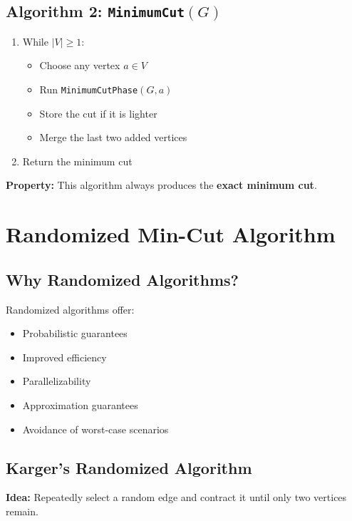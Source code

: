 \documentclass[11pt]{article}
\begin{document}
\subsection*{Algorithm 2: \texttt{MinimumCut$(G)$}}

\begin{enumerate}
    \item While $|V| \ge 1$:
    \begin{itemize}
        \item Choose any vertex $a \in V$
        \item Run \texttt{MinimumCutPhase$(G,a)$}
        \item Store the cut if it is lighter
        \item Merge the last two added vertices
    \end{itemize}
    \item Return the minimum cut
\end{enumerate}

\noindent
\textbf{Property:} This algorithm always produces the \textbf{exact minimum cut}.


\section{Randomized Min-Cut Algorithm}

\subsection{Why Randomized Algorithms?}

Randomized algorithms offer:
\begin{itemize}
    \item Probabilistic guarantees
    \item Improved efficiency
    \item Parallelizability
    \item Approximation guarantees
    \item Avoidance of worst-case scenarios
\end{itemize}

\subsection{Karger’s Randomized Algorithm}

\textbf{Idea:} Repeatedly select a random edge and contract it until only two vertices remain.
\end{document}
